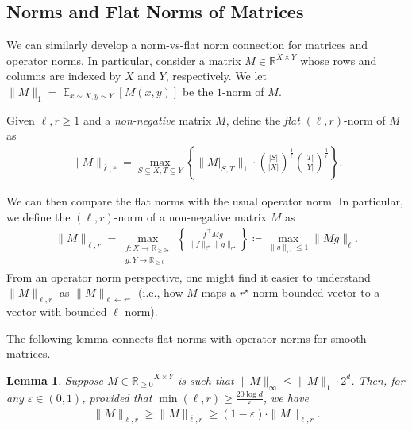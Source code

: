 \documentclass[11pt]{article}
\newtheorem{lemma}[theorem]{Lemma}
\newcommand{\R}{\mathbb{R}}
\DeclareMathOperator*{\E}{\mathbb{E}}
\newcommand{\1}{ \mathbbm{1}}
\newcommand{\eps}{\varepsilon}
\begin{document}
\subsection{Norms and Flat Norms of Matrices}

We can similarly develop a norm-vs-flat norm connection for matrices and operator norms. In particular, consider a matrix $M\in \mathbb{R}^{X\times Y}$ whose rows and columns are indexed by $X$ and $Y$, respectively. We let $\|M\|_1 = \E_{x\sim X,y\sim Y}[M(x,y)]$ be the $1$-norm of $M$. 


Given $\ell, r \ge 1$ and a \emph{non-negative} matrix $M$, define the \emph{flat} $(\ell, r)$-norm of $M$ as
\begin{align}
\| M \|_{\overline{\ell},\overline{r}} = \max_{S\subseteq X, T\subseteq Y} \left\{ \| M|_{S, T} \|_1 \cdot \left( \frac{|S|}{|X|} \right)^{\frac{1}{\ell}} \left( \frac{|T|}{|Y|}\right)^{\frac{1}{r}} \right\}. \label{equ: def matrix flat norm}
\end{align}

We can then compare the flat norms with the usual operator norm. In particular, we define the $(\ell,r)$-norm of a non-negative matrix $M$ as
\begin{align}
\| M \|_{\ell, r} = \max_{\substack{f:X\to \mathbb{R}_{\ge 0},\\ g:Y\to \mathbb{R}_{\ge 0}}} \left\{ \frac{f^\top M g}{ \|f\|_{\ell^\star} \|g\|_{r^\star}} \right\} \coloneqq \max_{\|g\|_{r^\star} \leq 1} \|M g \|_{\ell} . \label{equ: def matrix flat norm}
\end{align}
From an operator norm perspective, one might find it easier to understand $\|M \|_{\ell, r}$ as $\|M\|_{\ell\gets r^\star}$ (i.e., how $M$ maps a $r^\star$-norm bounded vector to a vector with bounded $\ell$-norm). %


The following lemma connects flat norms with operator norms for smooth matrices.

\begin{lemma}\label{lemma:flat-to-operator-norm}
Suppose $M\in {\R_{\ge 0}}^{X\times Y}$ is such that $\|M\|_{\infty} \le \|M\|_1 \cdot 2^d$. Then, for any $\eps\in (0, 1)$, provided that $\min(\ell, r)\ge \frac{20 \log d}{\eps}$, we have
\begin{align}
\|M\|_{\ell, r} \ge \|M\|_{\overline{\ell},\overline{r}} \ge (1-\eps)\cdot \| M \|_{\ell, r}. \label{equ:matrix flat vs operator norm} 
\end{align}
\end{lemma}
\end{document}
